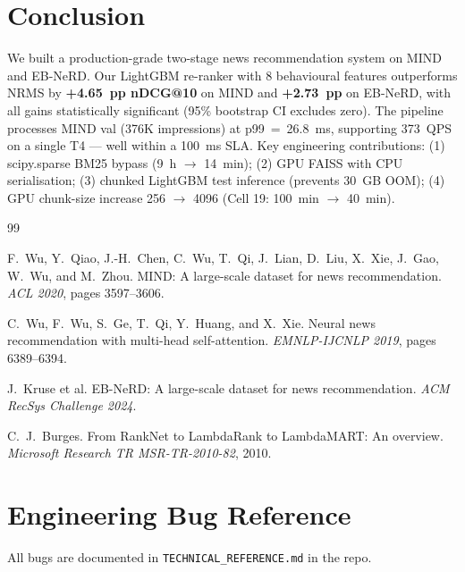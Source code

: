 \documentclass[11pt,a4paper]{article}
\begin{document}
\section{Conclusion}

We built a production-grade two-stage news recommendation system on MIND and
EB-NeRD. Our LightGBM re-ranker with 8 behavioural features outperforms NRMS by
\textbf{+4.65~pp nDCG@10} on MIND and \textbf{+2.73~pp} on EB-NeRD, with all
gains statistically significant (95\% bootstrap CI excludes zero). The pipeline
processes MIND val (376K impressions) at p99~=~26.8~ms, supporting 373~QPS on a
single T4 --- well within a 100~ms SLA. Key engineering contributions: (1)
scipy.sparse BM25 bypass (9~h $\to$ 14~min); (2) GPU FAISS with CPU
serialisation; (3) chunked LightGBM test inference (prevents 30~GB OOM); (4)
GPU chunk-size increase 256 $\to$ 4096 (Cell 19: 100~min $\to$ 40~min).


\begin{thebibliography}{99}

F.~Wu, Y.~Qiao, J.-H.~Chen, C.~Wu, T.~Qi, J.~Lian, D.~Liu, X.~Xie,
J.~Gao, W.~Wu, and M.~Zhou.
MIND: A large-scale dataset for news recommendation.
\emph{ACL 2020}, pages 3597--3606.

C.~Wu, F.~Wu, S.~Ge, T.~Qi, Y.~Huang, and X.~Xie.
Neural news recommendation with multi-head self-attention.
\emph{EMNLP-IJCNLP 2019}, pages 6389--6394.

J.~Kruse et al.
EB-NeRD: A large-scale dataset for news recommendation.
\emph{ACM RecSys Challenge 2024}.

C.~J.~Burges.
From RankNet to LambdaRank to LambdaMART: An overview.
\emph{Microsoft Research TR MSR-TR-2010-82}, 2010.

\end{thebibliography}

\appendix
\section{Engineering Bug Reference}

All bugs are documented in \texttt{TECHNICAL\_REFERENCE.md} in the repo.
\end{document}

